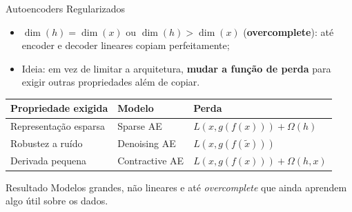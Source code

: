 \documentclass[aspectratio=169,xcolor=dvipsnames]{beamer}
\begin{document}
\begin{frame}{Autoencoders Regularizados}
    \begin{itemize}
        \item $\dim(h) = \dim(x)$ ou $\dim(h) > \dim(x)$ (\textbf{overcomplete}): até encoder e decoder lineares copiam perfeitamente;
        \item Ideia: em vez de limitar a arquitetura, \textbf{mudar a função de perda} para exigir outras propriedades além de copiar.
    \end{itemize}
    \vspace{0.1cm}
    \centering
    \small
    \begin{tabular}{@{}lll@{}}
        \toprule
        \textbf{Propriedade exigida} & \textbf{Modelo} & \textbf{Perda} \\
        \midrule
        Representação esparsa & Sparse AE & $L(x, g(f(x))) + \Omega(h)$ \\
        Robustez a ruído & Denoising AE & $L(x, g(f(\tilde{x})))$ \\
        Derivada pequena & Contractive AE & $L(x, g(f(x))) + \Omega(h, x)$ \\
        \bottomrule
    \end{tabular}
    \vspace{0.2cm}
    \begin{block}{Resultado}
        Modelos grandes, não lineares e até \textit{overcomplete} que ainda aprendem algo útil sobre os dados.
    \end{block}
\end{frame}
 
\end{document}
